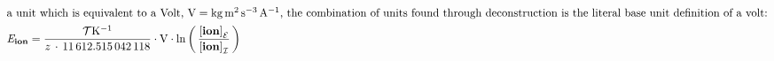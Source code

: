 \documentclass[class={myRUCProject}, crop=false]{standalone}
\begin{document}
\begin{subequations}
\begin{align}
    \intertext{a unit which is equivalent to a Volt, \( \unit{\volt} = \unit{\kilo\gram\square\meter\per\cubic\second\per\ampere} \), the combination of units found through deconstruction is the literal base unit definition of a volt:}
    \equi\ion &= \frac{ \clm{T}\unit{\per\K} }{ z\, \cdot \, \num{11612.515042118}} \cdot \unit{\volt} \cdot \ln \br{ \frac{ {\ionconc\excell} }{ {\ionconc\incell}} }\label{eq:derivedNerst}
\end{align}
\end{subequations}
\end{document}
